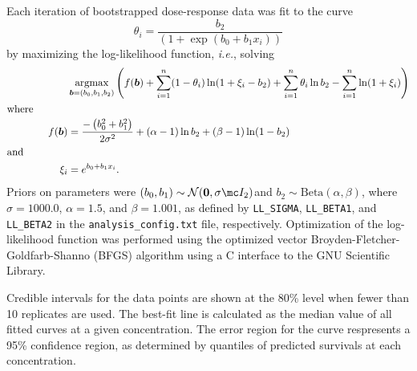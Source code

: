 \documentclass{article}
\DeclareMathOperator*{\argmax}{argmax}
\begin{document}
Each iteration of bootstrapped dose-response data was fit to the curve $$\theta_i = \frac{b_2}{\left(1 + \exp(b_0+b_1x_i) \right)}$$ by maximizing the log-likelihood function, \textit{i.e.}, solving 
\begin{align*}
&\argmax_{\bm b = (b_0, b_1, b_2)} \left( f(\bm b) + \sum^{n}_{i=1} (1-\theta_i) \ln(1 + \xi_i - b_2) + \sum^{n}_{i=1} \theta_i\ln b_2 - \sum^{n}_{i=1} \ln (1 + \xi_i)\right)\\\intertext{where} 
 \qquad \qquad f(\bm b) &= \frac{-\left(b_0^2 + b_1^2\right)}{2\sigma^2} + (\alpha - 1) \ln b_2 + (\beta - 1)\ln(1-b_2)\\\intertext{and} 
\qquad \qquad \xi_i &= e^{b_0 + b_1 x_i}.\end{align*}
Priors on parameters were $(b_0, b_1) \sim \mathcal{N}(\bm 0,\sigma \mc I_2)$and $b_2 \sim \text{Beta}(\alpha, \beta)$, where $\sigma = 1000.0$, $\alpha = 1.5$, and $\beta = 1.001$, as defined by \texttt{LL\_SIGMA}, \texttt{LL\_BETA1}, and \texttt{LL\_BETA2} in the \texttt{analysis\_config.txt} file, respectively.  Optimization of the log-likelihood function was performed using the optimized vector Broyden-Fletcher-Goldfarb-Shanno (BFGS) algorithm using a C interface to the GNU Scientific Library. 

Credible intervals for the data points are shown at the 80\% level when fewer than 10 replicates are used. The best-fit line is calculated as the median value of all fitted curves at a given concentration. The error region for the curve respresents a 95\% confidence region, as determined by quantiles of predicted survivals at each concentration.
\end{document}
